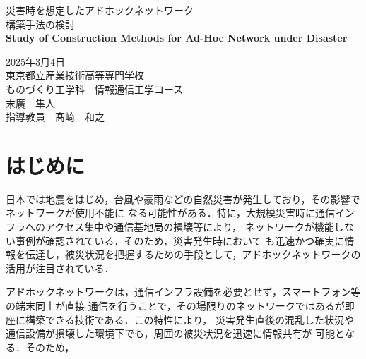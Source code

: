 \documentclass[a4paper, 11pt]{ltjsarticle}
\begin{document}
\fontsize{11pt}{14pt}\selectfont

\thispagestyle{empty}
\begin{center}

\vspace*{40mm}
{\huge\noindent 災害時を想定したアドホックネットワーク}\\
\medskip
{\huge\noindent 構築手法の検討}\\
\vspace{\baselineskip}
{\huge\noindent\textbf{Study of Construction Methods for Ad-Hoc Network under Disaster}}\\
\vspace{120mm}

{\huge\noindent
2025年3月4日\\
東京都立産業技術高等専門学校\\
ものづくり工学科　情報通信工学コース \\
末廣　隼人\\
指導教員　髙﨑　和之    \\
}
\vspace{40mm}

\end{center}

\clearpage  %
\thispagestyle{empty}
\tableofcontents  %

\clearpage
{}
\section{はじめに}
日本では地震をはじめ，台風や豪雨などの自然災害が発生しており，その影響でネットワークが使用不能に
なる可能性がある．特に，大規模災害時に通信インフラへのアクセス集中や通信基地局の損壊等により，
ネットワークが機能しない事例が確認されている\cite{通信インフラ被害}．そのため，災害発生時において
も迅速かつ確実に情報を伝達し，被災状況を把握するための手段として，アドホックネットワークの
活用が注目されている．

アドホックネットワークは，通信インフラ設備を必要とせず，スマートフォン等の端末同士が直接
通信を行うことで，その場限りのネットワークではあるが即座に構築できる技術である．この特性により，
災害発生直後の混乱した状況や通信設備が損壊した環境下でも，周囲の被災状況を迅速に情報共有が
可能となる．そのため，
\end{document}
